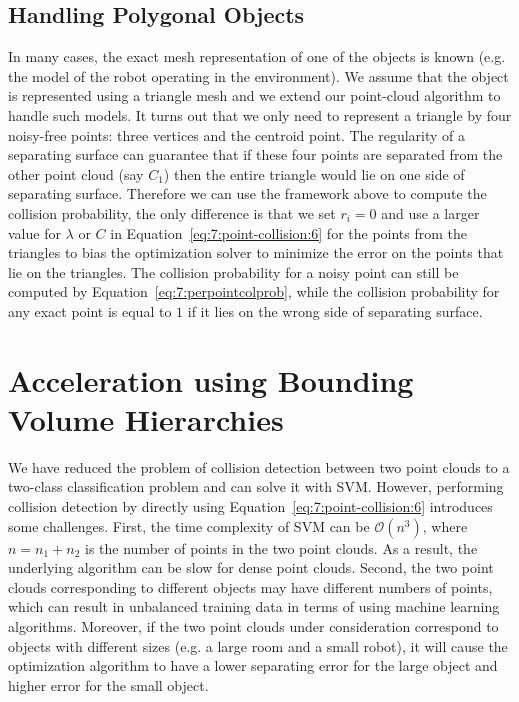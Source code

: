 \subsection{Handling Polygonal Objects}
In many cases, the exact mesh representation of one of the objects is known (e.g. the model of the robot operating in the environment).
We assume that the object is represented using a triangle mesh and we extend our point-cloud algorithm to handle such models.
It turns out that we only need to represent a triangle by four noisy-free points: three vertices and the centroid point.
The regularity of a separating surface can guarantee that if these four points are separated from the other point cloud (say $C_1$)
then the entire triangle would lie on one side of separating surface.
Therefore we can use the framework above to compute the collision probability, the only difference is that we
set $r_i = 0$ and use a larger value for $\lambda$ or $C$ in Equation~\ref{eq:7:point-collision:6} for the points from the triangles to bias
the optimization solver to minimize the error on  the points that lie on the triangles. The collision probability for a noisy point
can still be computed by Equation~\ref{eq:7:perpointcolprob}, while the collision probability for any exact point is equal to
$1$ if it lies on the wrong side of separating surface.


\section{Acceleration using Bounding Volume Hierarchies}
\label{sec:7:bvh}


We have reduced the problem of collision detection between two point clouds to a two-class classification problem and can solve it with SVM. However, performing
collision detection by directly using Equation~\ref{eq:7:point-collision:6} introduces some challenges. First, the time complexity of SVM can be $\mathcal O(n^3)$,
where $n = n_1 + n_2$ is the number of points in the two point clouds. As a result, the underlying algorithm can be slow for dense point clouds.
Second, the two point clouds corresponding to different objects may have different numbers of points, which can result in unbalanced training data in terms
of using machine learning algorithms.
Moreover, if the two point clouds under consideration correspond to objects with different sizes (e.g. a large room and a small robot), it will cause the optimization algorithm to have a lower separating error for the large object and higher error for the small object.

